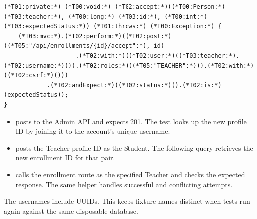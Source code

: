 \begin{lstlisting}[style=vsJava,firstnumber=98]
(*T01:private:*) (*T00:void:*) (*T02:accept:*)((*T00:Person:*) (*T03:teacher:*), (*T00:long:*) (*T03:id:*), (*T00:int:*) (*T03:expectedStatus:*)) (*T01:throws:*) (*T00:Exception:*) {
    (*T03:mvc:*).(*T02:perform:*)((*T02:post:*)((*T05:"/api/enrollments/{id}/accept":*), id)
                    .(*T02:with:*)((*T02:user:*)((*T03:teacher:*).(*T02:username:*)()).(*T02:roles:*)((*T05:"TEACHER":*))).(*T02:with:*)((*T02:csrf:*)()))
            .(*T02:andExpect:*)((*T02:status:*)().(*T02:is:*)(expectedStatus));
}
\end{lstlisting}


\begin{itemize}
\item {} posts to the Admin API and expects 201. The test
looks up the new profile ID by joining it to the account's unique username.
\item {} posts the Teacher profile ID as the Student. The following
query retrieves the new enrollment ID for that pair.
\item {} calls the enrollment route as the specified Teacher and
checks the expected response. The same helper handles successful and
conflicting attempts.
\end{itemize}

The usernames include UUIDs. This keeps fixture names distinct when tests run
again against the same disposable database.

\clearpage
